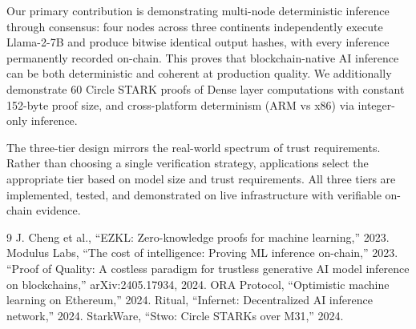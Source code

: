 \documentclass[conference]{IEEEtran}
\begin{document}
Our primary contribution is demonstrating multi-node deterministic inference through consensus: four nodes across three continents independently execute Llama-2-7B and produce bitwise identical output hashes, with every inference permanently recorded on-chain. This proves that blockchain-native AI inference can be both deterministic and coherent at production quality. We additionally demonstrate 60 Circle STARK proofs of Dense layer computations with constant 152-byte proof size, and cross-platform determinism (ARM vs x86) via integer-only inference.

The three-tier design mirrors the real-world spectrum of trust requirements. Rather than choosing a single verification strategy, applications select the appropriate tier based on model size and trust requirements. All three tiers are implemented, tested, and demonstrated on live infrastructure with verifiable on-chain evidence.

\begin{thebibliography}{9}
 J. Cheng et al., ``EZKL: Zero-knowledge proofs for machine learning,'' 2023.
 Modulus Labs, ``The cost of intelligence: Proving ML inference on-chain,'' 2023.
 ``Proof of Quality: A costless paradigm for trustless generative AI model inference on blockchains,'' arXiv:2405.17934, 2024.
 ORA Protocol, ``Optimistic machine learning on Ethereum,'' 2024.
 Ritual, ``Infernet: Decentralized AI inference network,'' 2024.
 StarkWare, ``Stwo: Circle STARKs over M31,'' 2024.
\end{thebibliography}
\end{document}
